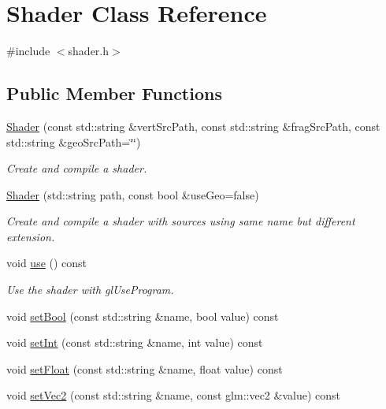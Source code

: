 \hypertarget{classShader}{}\section{Shader Class Reference}
\label{classShader}


{\ttfamily \#include $<$shader.\+h$>$}

\subsection*{Public Member Functions}
\begin{DoxyCompactItemize}
\item 
\hyperlink{classShader_a7e347bafb56502a85791603d3e52ba3c}{Shader} (const std\+::string \&vert\+Src\+Path, const std\+::string \&frag\+Src\+Path, const std\+::string \&geo\+Src\+Path=\char`\"{}\char`\"{})
\begin{DoxyCompactList}\small\item\em Create and compile a shader. \end{DoxyCompactList}\item 
\hyperlink{classShader_af43c2f34d90b61fd66c3b365f42392b2}{Shader} (std\+::string path, const bool \&use\+Geo=false)
\begin{DoxyCompactList}\small\item\em Create and compile a shader with sources using same name but different extension. \end{DoxyCompactList}\item 
void \hyperlink{classShader_a3c7896754f0e1fca8bde860cfef63832}{use} () const
\begin{DoxyCompactList}\small\item\em Use the shader with gl\+Use\+Program. \end{DoxyCompactList}\item 
void \hyperlink{classShader_ab1a56d6c299bd7eaa18c2e142ef7bd9f}{set\+Bool} (const std\+::string \&name, bool value) const
\item 
void \hyperlink{classShader_ad362e2b654cd95a3574cd505411e41fd}{set\+Int} (const std\+::string \&name, int value) const
\item 
void \hyperlink{classShader_afe7367621f74c2d26431d8ac15252bf3}{set\+Float} (const std\+::string \&name, float value) const
\item 
void \hyperlink{classShader_afd4d41322a1cdd1d5155bf124d19debf}{set\+Vec2} (const std\+::string \&name, const glm\+::vec2 \&value) const
\item 

\end{DoxyCompactItemize}
